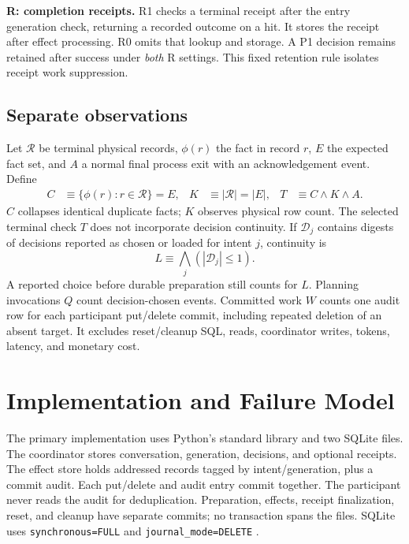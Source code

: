 \documentclass[10pt,letterpaper]{article}
\begin{document}
\textbf{R: completion receipts.} R1 checks a terminal receipt after the entry generation check, returning a recorded outcome on a hit. It stores the receipt after effect processing. R0 omits that lookup and storage. A P1 decision remains retained after success under \emph{both} R settings. This fixed retention rule isolates receipt work suppression.

\subsection{Separate observations}
Let $\mathcal R$ be terminal physical records, $\phi(r)$ the fact in record $r$, $E$ the expected fact set, and $A$ a normal final process exit with an acknowledgement event. Define
\begin{align}
C&\equiv\{\phi(r):r\in\mathcal R\}=E, &
K&\equiv|\mathcal R|=|E|, &
T&\equiv C\land K\land A.
\label{eq:terminal}
\end{align}
$C$ collapses identical duplicate facts; $K$ observes physical row count. The selected terminal check $T$ does not incorporate decision continuity. If $\mathcal D_j$ contains digests of decisions reported as chosen or loaded for intent $j$, continuity is
\begin{equation}
L\equiv\bigwedge_j(|\mathcal D_j|\leq1).
\label{eq:continuity}
\end{equation}
A reported choice before durable preparation still counts for $L$. Planning invocations $Q$ count decision-chosen events. Committed work $W$ counts one audit row for each participant put/delete commit, including repeated deletion of an absent target. It excludes reset/cleanup SQL, reads, coordinator writes, tokens, latency, and monetary cost.

\section{Implementation and Failure Model}
\label{sec:implementation}
The primary implementation uses Python's standard library and two SQLite files. The coordinator stores conversation, generation, decisions, and optional receipts. The effect store holds addressed records tagged by intent/generation, plus a commit audit. Each put/delete and audit entry commit together. The participant never reads the audit for deduplication. Preparation, effects, receipt finalization, reset, and cleanup have separate commits; no transaction spans the files. SQLite uses \texttt{synchronous=FULL} and \texttt{journal\_mode=DELETE} \cite{sqlite2026atomiccommit}.
\end{document}

